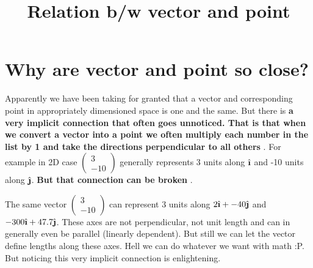 \documentclass[12pt]{article}
\title{Relation b/w vector and point}
\author{}
\date{}
\newcommand{\comment}[1]{}
\newcommand{\ihat}{\hat{\textbf{\i}}}
\newcommand{\jhat}{\hat{\textbf{\j}}}
\begin{document}
\maketitle

\section{Why are vector and point so close?}
Apparently we have been taking for granted that a vector and corresponding point in appropriately dimensioned space is one and the same. But there is \textbf{a very implicit connection that often goes unnoticed. That is that when we convert a vector into a point we often multiply each number in the list by 1 and take the directions perpendicular to all others} . For example in 2D case $ \comment{Column-Vector: 3, -10} \begin{pmatrix} 3 \\  -10 \end{pmatrix} $ generally represents 3 units along $ \ihat $ and -10 units along $ \jhat $. \textbf{But that connection can be broken} .

The same vector $ \comment{Column-Vector: 3, -10} \begin{pmatrix} 3 \\  -10 \end{pmatrix} $ can represent 3 units along $ 2\ihat + -40\jhat $ and $ -300\ihat + 47.7\jhat $. These axes are not perpendicular, not unit length and can in generally even be parallel (linearly dependent). But still we can let the vector define lengths along these axes. Hell we can do whatever we want with math :P. But noticing this very implicit connection is enlightening.
\end{document}
